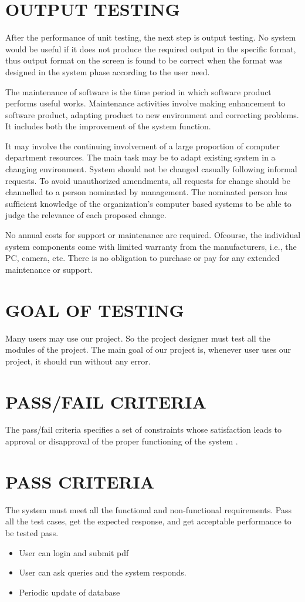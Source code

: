 \documentclass[12pt,a4paper,oneside]{report}
\begin{document}
 \section{OUTPUT TESTING}
 \par After the performance of unit testing, the next step is output testing. No system would be useful if it does not produce the required output in the speciﬁc format, thus output format on the screen is found to be correct when the format was designed in the system phase according to the user need.
 \par The maintenance of software is the time period in which software product performs useful works. Maintenance activities involve making enhancement to software product, adapting product to new environment and correcting problems. It includes both the improvement of the system function.  
\par It may involve the continuing involvement of a large proportion of computer department resources. The main task may be to adapt existing system in a changing environment. System should not be changed casually following informal requests. To avoid unauthorized amendments, all requests for change should be channelled to a person nominated by management. The nominated person has sufﬁcient knowledge of the organization’s computer based systems to be able to judge the relevance of each proposed change. 
\par No annual costs for support or maintenance are required. Ofcourse, the individual system components come with limited warranty from the manufacturers, i.e., the PC, camera, etc. There is no obligation to purchase or pay for any extended maintenance or support.
\section{GOAL OF TESTING}
\par Many users may use our project. So the project designer must test all the modules of the project. The main goal of our project is, whenever user uses our project, it should run without any error.
\section{PASS/FAIL CRITERIA}
\par The pass/fail criteria speciﬁes a set of constraints whose satisfaction leads to approval or disapproval of the proper functioning of the system .
\section{PASS CRITERIA}
\par The system must meet all the functional and non-functional requirements. Pass all the test cases, get the expected response, and get acceptable performance to be tested pass.
\begin{itemize}
\item User can login and submit pdf
\item  User can ask queries and the system responds.
\item Periodic update of database
\end{itemize}
\end{document}
